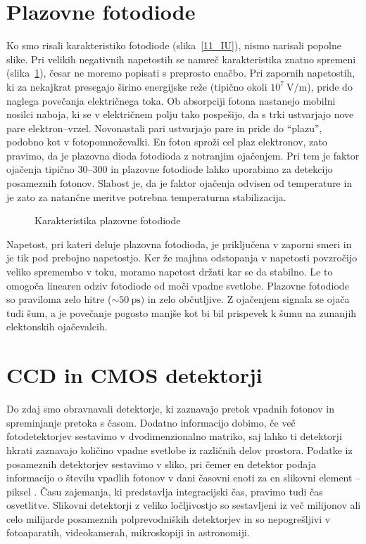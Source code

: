 \section{Plazovne fotodiode}
Ko smo risali karakteristiko fotodiode (slika~\ref{11_IU}), nismo narisali popolne slike.
Pri velikih negativnih napetostih se namreč karakteristika znatno spremeni (slika~\ref{11_plaz}), 
česar ne moremo popisati s preprosto enačbo. Pri zapornih napetostih, ki za nekajkrat presegajo 
širino energijske reže (tipično okoli $10^7~\si{\volt}/\si{\meter}$), 
pride do naglega povečanja električnega toka. Ob absorpciji fotona nastanejo mobilni nosilci naboja, ki 
se v električnem polju tako pospešijo, da s trki ustvarjajo nove pare 
elektron--vrzel. Novonastali pari  ustvarjajo pare in pride do ``plazu'', podobno kot v 
fotopomnoževalki. En foton  sproži cel plaz elektronov, zato pravimo, da je plazovna dioda
fotodioda z notranjim ojačenjem. Pri tem je faktor ojačenja tipično $30$--$300$ 
in plazovne fotodiode lahko 
uporabimo za detekcijo posameznih fotonov. Slabost je, da je faktor ojačenja odvisen od
temperature in je zato za natančne meritve potrebna temperaturna stabilizacija.
\begin{figure}[h]
\centering
\def\svgwidth{50truemm} 

\caption{Karakteristika plazovne fotodiode}
\label{11_plaz}
\end{figure}

Napetost, pri kateri deluje plazovna fotodioda, je priključena v zaporni smeri 
in je tik pod prebojno napetostjo. Ker že  majhna odstopanja v napetosti povzročijo veliko
spremembo v toku, moramo napetost držati kar se da stabilno. Le to omogoča
linearen odziv fotodiode od moči vpadne svetlobe. Plazovne fotodiode so praviloma zelo hitre 
($\sim 50~\si{\pico\second})$ in zelo občutljive. Z ojačenjem signala se ojača tudi šum, a je 
povečanje pogosto manjše kot bi bil prispevek k šumu na zunanjih elektonskih ojačevalcih. 

\section{CCD in CMOS detektorji}
Do zdaj smo obravnavali detektorje, 
ki zaznavajo pretok vpadnih fotonov in spreminjanje
pretoka s časom. Dodatno informacijo dobimo, če več fotodetektorjev sestavimo v 
dvodimenzionalno matriko, saj lahko ti detektorji hkrati zaznavajo količino vpadne svetlobe 
iz različnih delov prostora. Podatke iz posameznih detektorjev sestavimo v sliko, pri čemer 
en detektor podaja informacijo o številu vpadlih fotonov 
v dani časovni enoti za en slikovni element -- piksel . Času zajemanja, ki
predstavlja integracijski čas, pravimo tudi čas osvetlitve.  
Slikovni detektorji z veliko ločljivostjo so sestavljeni iz 
več milijonov ali celo milijarde posameznih polprevodniških detektorjev in so 
nepogrešljivi v fotoaparatih, videokamerah, mikroskopiji in astronomiji.

